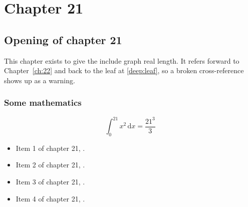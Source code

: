 \chapter{Chapter 21}
\label{ch:21}
\section{Opening of chapter 21}
This chapter exists to give the include graph real length. It refers
forward to Chapter~\ref{ch:22} and back to the leaf
at \ref{deep:leaf}, so a broken cross-reference shows up as a warning.

\subsection{Some mathematics}
\begin{equation}
  \int_0^{21} x^{2} \, \mathrm{d}x = \frac{21^{3}}{3}
\end{equation}

\begin{itemize}
  \item Item 1 of chapter 21, .
  \item Item 2 of chapter 21, .
  \item Item 3 of chapter 21, .
  \item Item 4 of chapter 21, .
\end{itemize}
